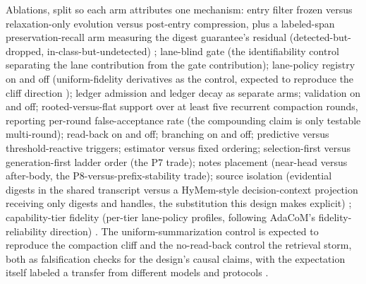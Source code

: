 \documentclass[11pt]{article}
\begin{document}
Ablations, split so each arm attributes one mechanism: entry filter frozen versus relaxation-only evolution versus post-entry compression, plus a labeled-span preservation-recall arm measuring the digest guarantee's residual (detected-but-dropped, in-class-but-undetected) \cite{taco2026}; lane-blind gate (the identifiability control separating the lane contribution from the gate contribution); lane-policy registry on and off (uniform-fidelity derivatives as the control, expected to reproduce the cliff direction \cite{cliff2026}); ledger admission and ledger decay as separate arms; validation on and off; rooted-versus-flat support over at least five recurrent compaction rounds, reporting per-round false-acceptance rate (the compounding claim is only testable multi-round); read-back on and off; branching on and off; predictive versus threshold-reactive triggers; estimator versus fixed ordering; selection-first versus generation-first ladder order (the P7 trade); notes placement (near-head versus after-body, the P8-versus-prefix-stability trade); source isolation (evidential digests in the shared transcript versus a HyMem-style decision-context projection receiving only digests and handles, the substitution this design makes explicit) \cite{hymem2026}; capability-tier fidelity (per-tier lane-policy profiles, following AdaCoM's fidelity-reliability direction) \cite{adacom2026}. The uniform-summarization control is expected to reproduce the compaction cliff and the no-read-back control the retrieval storm, both as falsification checks for the design's causal claims, with the expectation itself labeled a transfer from different models and protocols \cite{cliff2026,interact2026}.
\end{document}
